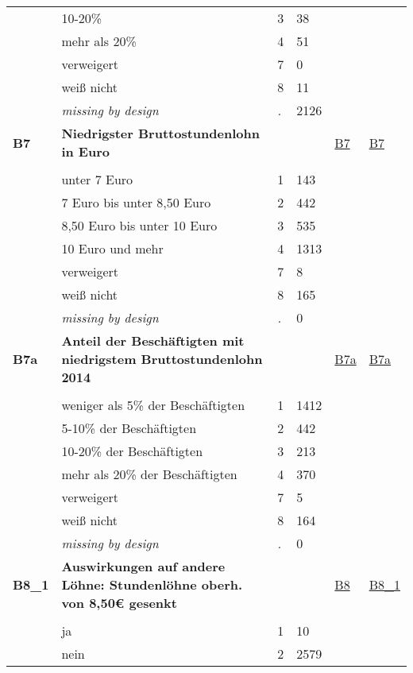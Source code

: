\begin{longtable}{| L{2.45cm} | L{6cm} | C{1.5cm} | R{1cm} | C{2.25cm} | C{2.25cm} |}
   & 10-20\% & 3 & 38 &  &  \\ 
   & mehr als 20\% & 4 & 51 &  &  \\ 
   & verweigert & 7 & 0 &  &  \\ 
   & weiß nicht & 8 & 11 &  &  \\ 
   & \textit{missing by design} & \textit{.} & 2126 &  &  \\ 
   \midrule
\textbf{B7}\label{var:B7} & \textbf{Niedrigster Bruttostundenlohn in Euro} &  &  & \hyperref[B7]{B7} & \hyperref[var:suf:B7]{B7} \\ 
   &  &  &  &  &  \\ 
   & unter 7 Euro & 1 & 143 &  &  \\ 
   & 7 Euro bis unter 8,50 Euro & 2 & 442 &  &  \\ 
   & 8,50 Euro bis unter 10 Euro & 3 & 535 &  &  \\ 
   & 10 Euro und mehr & 4 & 1313 &  &  \\ 
   & verweigert & 7 & 8 &  &  \\ 
   & weiß nicht & 8 & 165 &  &  \\ 
   & \textit{missing by design} & \textit{.} & 0 &  &  \\ 
   \midrule
\textbf{B7a}\label{var:B7a} & \textbf{Anteil der Beschäftigten mit niedrigstem Bruttostundenlohn 2014} &  &  & \hyperref[B7a]{B7a} & \hyperref[var:suf:B7a]{B7a} \\ 
   &  &  &  &  &  \\ 
   & weniger als 5\% der Beschäftigten & 1 & 1412 &  &  \\ 
   & 5-10\% der Beschäftigten & 2 & 442 &  &  \\ 
   & 10-20\% der Beschäftigten & 3 & 213 &  &  \\ 
   & mehr als 20\% der Beschäftigten & 4 & 370 &  &  \\ 
   & verweigert & 7 & 5 &  &  \\ 
   & weiß nicht & 8 & 164 &  &  \\ 
   & \textit{missing by design} & \textit{.} & 0 &  &  \\ 
   \midrule
\textbf{B8\_1}\label{var:B8:1} & \textbf{Auswirkungen auf andere Löhne: Stundenlöhne oberh. von 8,50€ gesenkt} &  &  & \hyperref[B8]{B8} & \hyperref[var:suf:B8:1]{B8\_1} \\ 
   &  &  &  &  &  \\ 
   & ja & 1 & 10 &  &  \\ 
   & nein & 2 & 2579 &  &  \\ 

\end{longtable}
